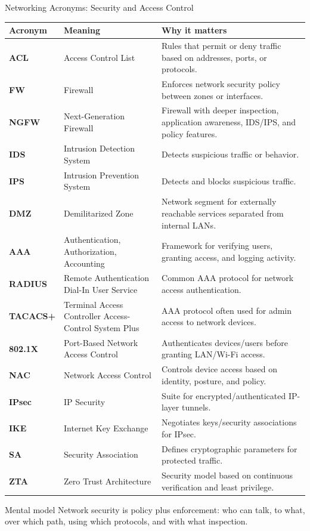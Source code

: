 \documentclass[aspectratio=169]{beamer}
\begin{document}
\begin{frame}{Networking Acronyms: Security and Access Control}
\tiny

\begin{tabular}{p{1.8cm} p{3.7cm} p{6.7cm}}
\toprule
\textbf{Acronym} & \textbf{Meaning} & \textbf{Why it matters} \\
\midrule
\textbf{ACL} & Access Control List & Rules that permit or deny traffic based on addresses, ports, or protocols. \\
\textbf{FW} & Firewall & Enforces network security policy between zones or interfaces. \\
\textbf{NGFW} & Next-Generation Firewall & Firewall with deeper inspection, application awareness, IDS/IPS, and policy features. \\
\textbf{IDS} & Intrusion Detection System & Detects suspicious traffic or behavior. \\
\textbf{IPS} & Intrusion Prevention System & Detects and blocks suspicious traffic. \\
\textbf{DMZ} & Demilitarized Zone & Network segment for externally reachable services separated from internal LANs. \\
\textbf{AAA} & Authentication, Authorization, Accounting & Framework for verifying users, granting access, and logging activity. \\
\textbf{RADIUS} & Remote Authentication Dial-In User Service & Common AAA protocol for network access authentication. \\
\textbf{TACACS+} & Terminal Access Controller Access-Control System Plus & AAA protocol often used for admin access to network devices. \\
\textbf{802.1X} & Port-Based Network Access Control & Authenticates devices/users before granting LAN/Wi-Fi access. \\
\textbf{NAC} & Network Access Control & Controls device access based on identity, posture, and policy. \\
\textbf{IPsec} & IP Security & Suite for encrypted/authenticated IP-layer tunnels. \\
\textbf{IKE} & Internet Key Exchange & Negotiates keys/security associations for IPsec. \\
\textbf{SA} & Security Association & Defines cryptographic parameters for protected traffic. \\
\textbf{ZTA} & Zero Trust Architecture & Security model based on continuous verification and least privilege. \\
\bottomrule
\end{tabular}

\vspace{0.12cm}

\begin{block}{Mental model}
Network security is policy plus enforcement: who can talk, to what, over which path, using which protocols, and with what inspection.
\end{block}

\end{frame}
\end{document}
